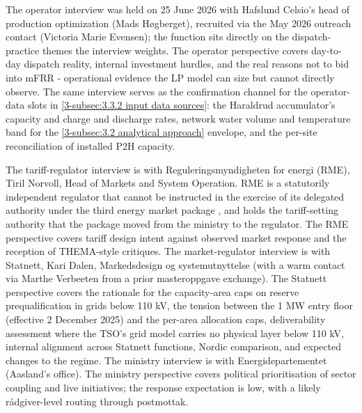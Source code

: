 The operator interview was held on 25 June 2026 with Hafslund Celsio's head of production optimization (Mads Høgberget), recruited via the May 2026 outreach contact (Victoria Marie Evensen); the function sits directly on the dispatch-practice themes the interview weights. The operator perspective covers day-to-day dispatch reality, internal investment hurdles, and the real reasons not to bid into mFRR - operational evidence the LP model can size but cannot directly observe. The same interview serves as the confirmation channel for the operator-data slots in \autoref{3-subsec:3.3.2 input data sources}: the Haraldrud accumulator's capacity and charge and discharge rates, network water volume and temperature band for the \autoref{3-subsec:3.2 analytical approach} envelope, and the per-site reconciliation of installed P2H capacity. 

The tariff-regulator interview is with Reguleringsmyndigheten for energi (RME), Tiril Norvoll, Head of Markets and System Operation. RME is a statutorily independent regulator that cannot be instructed in the exercise of its delegated authority under the third energy market package \cite{stortinget_vedtak_2019}, and holds the tariff-setting authority that the package moved from the ministry to the regulator. The RME perspective covers tariff design intent against observed market response and the reception of THEMA-style critiques. The market-regulator interview is with Statnett, Kari Dalen, Markedsdesign og systemutnyttelse (with a warm contact via Marthe Verbeeten from a prior masteroppgave exchange). The Statnett perspective covers the rationale for the capacity-area caps on reserve prequalification in grids below 110 kV, the tension between the 1 MW entry floor (effective 2 December 2025) and the per-area allocation caps, deliverability assessment where the TSO's grid model carries no physical layer below 110 kV, internal alignment across Statnett functions, Nordic comparison, and expected changes to the regime. The ministry interview is with Energidepartementet (Aasland's office). The ministry perspective covers political prioritisation of sector coupling and live initiatives; the response expectation is low, with a likely rådgiver-level routing through postmottak.

